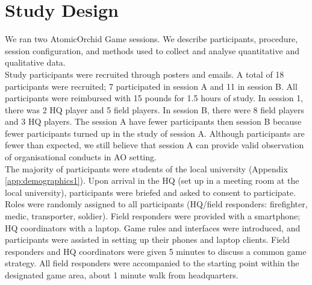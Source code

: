 
\section{Study Design}
We ran two AtomicOrchid Game sessions. We describe participants, procedure, session configuration, and methods used to collect and analyse quantitative and qualitative data.\\

Study participants were recruited through posters and emails. A total of 18 participants were recruited; 7 participated in session A and 11 in session B. All participants were reimbursed with 15 pounds for 1.5 hours of study. In session 1, there was 2 HQ player and 5 field players. In session B, there were 8 field players and 3 HQ players. The session A have fewer participants then session  B because fewer participants turned up in the study of session A. Although participants are fewer than expected, we still believe that session A can provide valid observation of organisational conducts in \ac{AO} setting.\\

The majority of participants were students of the local university (Appendix \ref{app:demographics1}). Upon arrival in the HQ (set up in a meeting room at the local university), participants were briefed and asked to consent to participate. Roles were randomly assigned to all participants (HQ/field responders: firefighter, medic, transporter, soldier). Field responders were provided with a smartphone; HQ coordinators with a laptop. Game rules and interfaces were introduced, and participants were assisted in setting up their phones and laptop clients. Field responders and HQ coordinators were given 5 minutes to discuss a common game strategy. All field responders were accompanied to the starting point within the designated game area, about 1 minute walk from headquarters.\\

